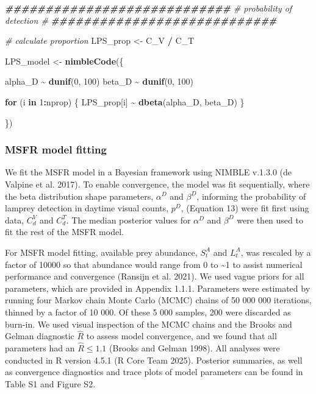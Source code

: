 \documentclass[
]{article}
\newenvironment{Shaded}{\begin{snugshade}}{\end{snugshade}}
\newcommand{\CommentTok}[1]{\textcolor[rgb]{0.56,0.35,0.01}{\textit{#1}}}
\newcommand{\ControlFlowTok}[1]{\textcolor[rgb]{0.13,0.29,0.53}{\textbf{#1}}}
\newcommand{\DecValTok}[1]{\textcolor[rgb]{0.00,0.00,0.81}{#1}}
\newcommand{\DocumentationTok}[1]{\textcolor[rgb]{0.56,0.35,0.01}{\textbf{\textit{#1}}}}
\newcommand{\FunctionTok}[1]{\textcolor[rgb]{0.13,0.29,0.53}{\textbf{#1}}}
\newcommand{\NormalTok}[1]{#1}
\newcommand{\OtherTok}[1]{\textcolor[rgb]{0.56,0.35,0.01}{#1}}
\newcommand{\SpecialCharTok}[1]{\textcolor[rgb]{0.81,0.36,0.00}{\textbf{#1}}}
\begin{document}
\begin{Shaded}
\begin{Highlighting}[]
\DocumentationTok{\#\#\#\#\#\#\#\#\#\#\#\#\#\#\#\#\#\#\#\#\#\#\#\#\#\#\#\#}
\CommentTok{\# probability of detection \#}
\DocumentationTok{\#\#\#\#\#\#\#\#\#\#\#\#\#\#\#\#\#\#\#\#\#\#\#\#\#\#\#\#}

\CommentTok{\# calculate proportion}
\NormalTok{LPS\_prop }\OtherTok{\textless{}{-}}\NormalTok{ C\_V }\SpecialCharTok{/}\NormalTok{ C\_T}

\NormalTok{LPS\_model }\OtherTok{\textless{}{-}} \FunctionTok{nimbleCode}\NormalTok{(\{}
  
\NormalTok{  alpha\_D }\SpecialCharTok{\textasciitilde{}} \FunctionTok{dunif}\NormalTok{(}\DecValTok{0}\NormalTok{, }\DecValTok{100}\NormalTok{)}
\NormalTok{  beta\_D }\SpecialCharTok{\textasciitilde{}} \FunctionTok{dunif}\NormalTok{(}\DecValTok{0}\NormalTok{, }\DecValTok{100}\NormalTok{)}
  
  \ControlFlowTok{for}\NormalTok{ (i }\ControlFlowTok{in} \DecValTok{1}\SpecialCharTok{:}\NormalTok{nprop) \{}
\NormalTok{    LPS\_prop[i] }\SpecialCharTok{\textasciitilde{}} \FunctionTok{dbeta}\NormalTok{(alpha\_D, beta\_D)}
\NormalTok{  \}}
  
\NormalTok{\})}
\end{Highlighting}
\end{Shaded}

\subsubsection{MSFR model fitting}\label{msfr-model-fitting}

We fit the MSFR model in a Bayesian framework using NIMBLE v.1.3.0 (de
Valpine et al. 2017). To enable convergence, the model was fit
sequentially, where the beta distribution shape parameters, \(\alpha^D\)
and \(\beta^D\), informing the probability of lamprey detection in
daytime visual counts, \(p^D\), (Equation 13) were fit first using data,
\(C_d^V\) and \(C_d^T\). The median posterior values for \(\alpha^D\)
and \(\beta^D\) were then used to fit the rest of the MSFR model.

For MSFR model fitting, available prey abundance, \(S^A_t\) and
\(L^A_t\), was rescaled by a factor of 10000 so that abundance would
range from 0 to \textasciitilde1 to assist numerical performance and
convergence (Ransijn et al. 2021). We used vague priors for all
parameters, which are provided in Appendix 1.1.1. Parameters were
estimated by running four Markov chain Monte Carlo (MCMC) chains of 50
000 000 iterations, thinned by a factor of 10 000. Of these 5 000
samples, 200 were discarded as burn-in. We used visual inspection of the
MCMC chains and the Brooks and Gelman diagnostic \(\hat{R}\) to assess
model convergence, and we found that all parameters had an
\(\hat{R} \leq 1.1\) (Brooks and Gelman 1998). All analyses were
conducted in R version 4.5.1 (R Core Team 2025). Posterior summaries, as
well as convergence diagnostics and trace plots of model parameters can
be found in Table S1 and Figure S2.
\end{document}
